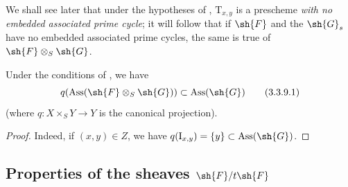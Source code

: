 \begin{remarks}[3.3.8]
\label{IV.3.3.8}
We shall see later  that under the hypotheses of , $\mathrm{T}_{x,y}$ is a prescheme \emph{with no embedded associated prime cycle}; it will follow that if $\sh{F}$ and the $\sh{G}_s$ have no embedded associated prime cycles, the same is true of $\sh{F}\otimes_S\sh{G}$.
\end{remarks}

\begin{corollary}[3.3.9]
\label{IV.3.3.9}
Under the conditions of , we have
\[
\label{IV.3.3.9.1}
q(\operatorname{Ass}(\sh{F}\otimes_S\sh{G}))\subset\operatorname{Ass}(\sh{G})
\tag{3.3.9.1}
\]
(where $q:X\times_S Y\to Y$ is the canonical projection).
\end{corollary}

\begin{proof}
Indeed, if $(x,y)\in Z$, we have $q(\mathrm{I}_{x,y})=\{y\}\subset\operatorname{Ass}(\sh{G})$.
\end{proof}


\subsection{Properties of the sheaves \texorpdfstring{$\sh{F}/t\sh{F}$}{F/tF}}
\label{subsection:IV.3.4}
\label{IV.3.4}

